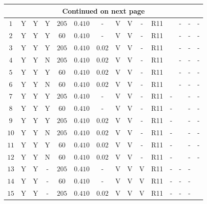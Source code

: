 \begin{center}
\begin{longtable}{@{\extracolsep{\fill}}ccccccccccccccc@{}}
\hline \multicolumn{15}{c}{{Continued on next page}} \\ \hline
\endfoot

\hline \hline
\endlastfoot
\rule[-1ex]{0pt}{2.5ex} $1$ & Y & Y & Y & $205$ & $0.410$ & - & V & V & - & R11 & \cite{Humphreys:2013eja} & - & - & - \\ 
\rule[-1ex]{0pt}{2.5ex} $2$ & Y & Y & Y & $60$ & $0.410$ & - & V & V & - & R11 & \cite{Humphreys:2013eja} & - & - & - \\ 
\rule[-1ex]{0pt}{2.5ex} $3$ & Y & Y & Y & $205$ & $0.410$ & $0.02$ & V & V & - & R11 & \cite{Humphreys:2013eja} & - & - & - \\ 
\rule[-1ex]{0pt}{2.5ex} $4$ & Y & Y & N & $205$ & $0.410$ & $0.02$ & V & V & - & R11 & \cite{Humphreys:2013eja} & - & - & - \\ 
\rule[-1ex]{0pt}{2.5ex} $5$ & Y & Y & Y & $60$ & $0.410$ & $0.02$ & V & V & - & R11 & \cite{Humphreys:2013eja} & - & - & - \\ 
\rule[-1ex]{0pt}{2.5ex} $6$ & Y & Y & N & $60$ & $0.410$ & $0.02$ & V & V & - & R11 & \cite{Humphreys:2013eja} & - & - & - \\ 
\rule[-1ex]{0pt}{2.5ex} $7$ & Y & Y & Y & $205$ & $0.410$ & - & V & V & - & R11 & - & \cite{Pietrzynski:2013gia} & - & - \\ 
\rule[-1ex]{0pt}{2.5ex} $8$ & Y & Y & Y & $60$ & $0.410$ & - & V & V & - & R11 & - & \cite{Pietrzynski:2013gia} & - & - \\ 
\rule[-1ex]{0pt}{2.5ex} $9$ & Y & Y & Y & $205$ & $0.410$ & $0.02$ & V & V & - & R11 & - & \cite{Pietrzynski:2013gia} & - & - \\ 
\rule[-1ex]{0pt}{2.5ex} $10$ & Y & Y & N & $205$ & $0.410$ & $0.02$ & V & V & - & R11 & - & \cite{Pietrzynski:2013gia} & - & - \\ 
\rule[-1ex]{0pt}{2.5ex} $11$ & Y & Y & Y & $60$ & $0.410$ & $0.02$ & V & V & - & R11 & - & \cite{Pietrzynski:2013gia} & - & - \\ 
\rule[-1ex]{0pt}{2.5ex} $12$ & Y & Y & N & $60$ & $0.410$ & $0.02$ & V & V & - & R11 & - & \cite{Pietrzynski:2013gia} & - & - \\
\rule[-1ex]{0pt}{2.5ex} $13$ & Y & Y & - & $205$ & $0.410$ & - & V & V & V & R11 & - & - & - & \cite{vanLeeuwen:2007xw} \\ 
\rule[-1ex]{0pt}{2.5ex} $14$ & Y & Y & - & $60$ & $0.410$ & - & V & V & V & R11 & - & - & - & \cite{vanLeeuwen:2007xw} \\
\rule[-1ex]{0pt}{2.5ex} $15$ & Y & Y & - & $205$ & $0.410$ & $0.02$ & V & V & V & R11 & - & - & - & \cite{vanLeeuwen:2007xw} \\

\end{longtable}
\end{center}
